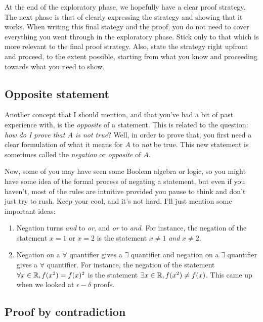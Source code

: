 \documentclass{amsart}
\begin{document}
At the end of the exploratory phase, we hopefully have a clear proof
strategy. The next phase is that of clearly expressing the strategy
and showing that it works. When writing this final stategy and the
proof, you do not need to cover everything you went through in the
exploratory phase. Stick only to that which is more relevant to the
final proof strategy. Also, state the strategy right upfront and
proceed, to the extent possible, starting from what you know and
proceeding towards what you need to show.

\subsection{Opposite statement}

Another concept that I should mention, and that you've had a bit of
past experience with, is the {\em opposite} of a statement. This is
related to the question: {\em how do I prove that $A$ is not true}?
Well, in order to prove that, you first need a clear formulation of
what it means for $A$ to {\em not} be true. This new statement is
sometimes called the {\em negation} or {\em opposite} of $A$.

Now, some of you may have seen some Boolean algebra or logic, so you
might have some idea of the formal process of negating a statement,
but even if you haven't, most of the rules are intuitive provided you
pause to think and don't just try to rush. Keep your cool, and it's
not hard. I'll just mention some important ideas:

\begin{enumerate}

\item Negation turns {\em and} to {\em or}, and {\em or} to {\em
  and}. For instance, the negation of the statement $x = 1$ or $x = 2$
  is the statement $x \ne 1$ {\em and} $x \ne 2$.

\item Negation on a $\forall$ quantifier gives a $\exists$ quantifier
  and negation on a $\exists$ quantifier gives a $\forall$
  quantifier. For instance, the negation of the statement $\forall x
  \in \mathbb{R}, f(x^2) = f(x)^2$ is the statement $\exists x \in \mathbb{R}, f(x^2)
  \ne f(x)$. This came up when we looked at $\epsilon-\delta$ proofs.

\end{enumerate}

\subsection{Proof by contradiction}
\end{document}
